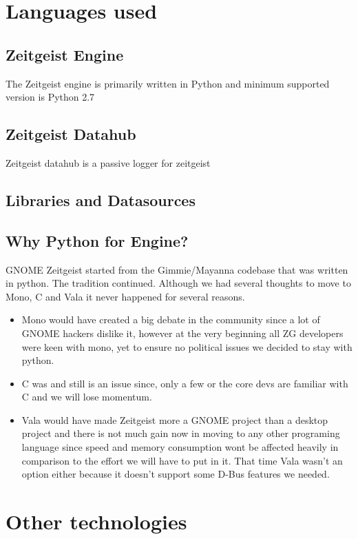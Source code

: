 \section{Languages used}

\subsection{Zeitgeist Engine}
The Zeitgeist engine is primarily written in Python and minimum supported version is Python 2.7


\subsection{Zeitgeist Datahub}
Zeitgeist datahub is a passive logger for zeitgeist

\subsection{Libraries and Datasources}
\subsection{Why Python for Engine?}
GNOME Zeitgeist started from the Gimmie/Mayanna codebase that was written 
in python. The tradition continued. Although we had several thoughts to move 
to Mono, C and Vala it never happened for several reasons. 
\begin{itemize}
\item Mono would have created a big debate in the community since a lot of 
GNOME hackers dislike it, however at the very beginning all ZG developers were 
keen with mono, yet to ensure no political issues we decided to stay with python.
\item C was and still is an issue since, only a few or the core devs are familiar 
with C and we will lose momentum.
\item Vala would have made Zeitgeist more a GNOME project than a desktop project 
and there is not much gain now in moving to any other programing language since 
speed and memory consumption wont be affected heavily in comparison to the effort 
we will have to put in it. That time Vala wasn't an option either because it 
doesn't support some D-Bus features we needed.
\end{itemize}




\section{Other technologies}
